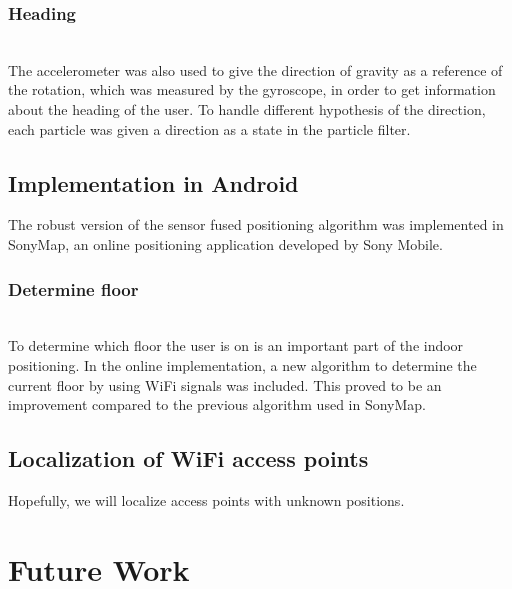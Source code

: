 \documentclass{LTHthesis}
\begin{document}
\subsubsection{Heading} ~\\
The accelerometer was also used to give the direction of gravity as a reference of the rotation, which was measured by the gyroscope, in order to get information about the heading of the user. To handle different hypothesis of the direction, each particle was given a direction as a state in the particle filter.



\subsection{Implementation in Android}
The robust version of the sensor fused positioning algorithm was implemented in SonyMap, an online positioning application developed by Sony Mobile.

\subsubsection{Determine floor} ~\\
To determine which floor the user is on is an important part of the indoor positioning. In the online implementation, a new algorithm to determine the current floor by using WiFi signals was included. This proved to be an improvement compared to the previous algorithm used in SonyMap.



\subsection{Localization of WiFi access points}
Hopefully, we will localize access points with unknown positions.


\section{Future Work}

\printbibliography  %
\end{document}
